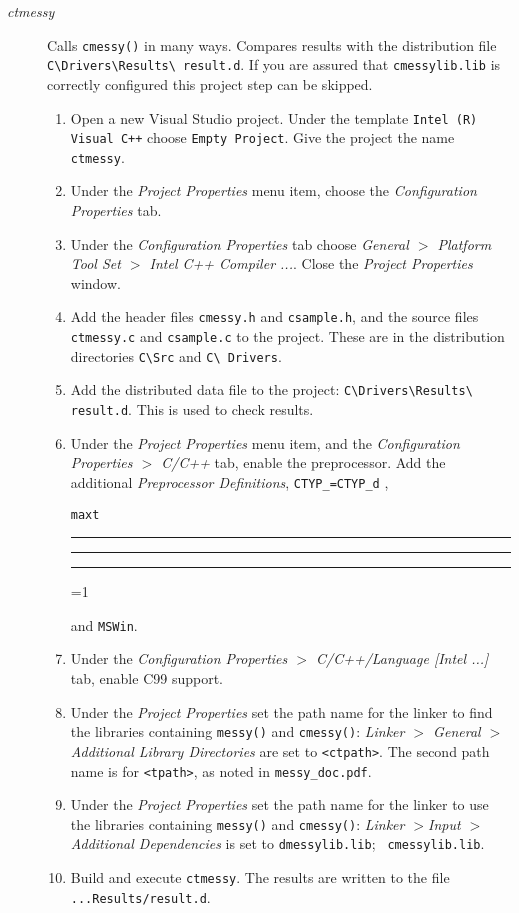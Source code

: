 \documentclass[12pt]{article}
\DeclareRobustCommand{\us}{\rule{.2pt}{0pt}\rule[-.8pt]{.4em}{.5pt}%
\rule{.2pt}{0pt}}
\DeclareRobustCommand{\us}{\rule{.2pt}{0pt}\rule[-.8pt]{.4em}{.5pt}%
\rule{.2pt}{0pt}}
\begin{document}
\begin{description}
\item[{\em ctmessy}] Calls {\tt cmessy()} in many ways.  Compares results with
  the distribution file \\{\tt C\textbackslash Drivers\textbackslash Results\textbackslash
    result.d}.  If you are assured that {\tt cmessylib.lib} is correctly
  configured this project step can be skipped.
  \begin{enumerate}
  \item Open a new Visual Studio project.  Under the template {\tt Intel (R)
      Visual C++} choose {\tt Empty Project}.  Give the project the name {\tt
      ctmessy}.
  \item Under the {\em Project Properties} menu item, choose the {\em
      Configuration Properties} tab.
  \item Under the {\em Configuration Properties} tab choose {\em General $>$
      Platform Tool Set $>$ Intel C++ Compiler ...}.  Close the {\em Project
      Properties} window.
  \item Add the header files {\tt cmessy.h} and {\tt csample.h}, and the source
    files {\tt ctmessy.c} and {\tt csample.c} to the project.  These are in the
    distribution directories {\tt C\textbackslash Src} and {\tt C\textbackslash
      Drivers}.
      \item Add the  distributed data file to the project: {\tt C\textbackslash Drivers\textbackslash Results\textbackslash
    result.d}.  This is used to check results.
  \item Under the {\em Project Properties} menu item, and the {\em Configuration
      Properties $>$ C/C++} tab, enable the preprocessor.  Add the additional
    {\em Preprocessor Definitions}, {\tt CTYP\_=CTYP\_d} , {\tt maxt\us=1} and
    {\tt MSWin}.
  \item Under the {\em Configuration Properties $>$ C/C++/Language [Intel ...]}
    tab, enable C99 support.
  \item Under the {\em Project Properties} set the path name for the linker to
    find the libraries containing {\tt messy()} and {\tt cmessy()}: {\em Linker
      $>$ General $>$ Additional Library Directories} are set to {\tt <ctpath>}.
    The second path name is for {\tt <tpath>}, as noted in {\tt messy\_doc.pdf}.

  \item Under the {\em Project Properties} set the path name for the linker to
    use the libraries containing {\tt messy()} and {\tt cmessy()}: {\em Linker
      $>$Input $>$ Additional Dependencies} is set to {\tt dmessylib.lib}; {\tt
      cmessylib.lib}.
  \item Build and execute {\tt ctmessy}.  The results are written to the file
    {\tt ...Results/result.d}.
  \end {enumerate}


\end{description}
\end{document}
